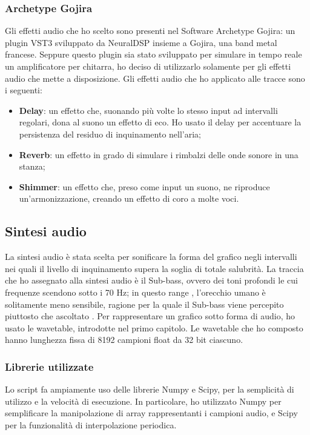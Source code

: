 \subsubsection{Archetype Gojira}
Gli effetti audio che ho scelto sono presenti nel Software Archetype Gojira: un plugin VST3 sviluppato da NeuralDSP insieme a Gojira, una band metal francese.
Seppure questo plugin sia stato sviluppato per simulare in tempo reale un amplificatore per chitarra, ho deciso di utilizzarlo solamente per gli effetti audio che mette a disposizione.
Gli effetti audio che ho applicato alle tracce sono i seguenti:
\begin{itemize}
    \item \textbf{Delay}: un effetto che, suonando più volte lo stesso input ad intervalli regolari, dona al suono un effetto di eco. Ho usato il delay per accentuare la persistenza del residuo di inquinamento nell'aria;
    \item \textbf{Reverb}: un effetto in grado di simulare i rimbalzi delle onde sonore in una stanza;
    \item \textbf{Shimmer}: un effetto che, preso come input un suono, ne riproduce un'armonizzazione, creando un effetto di coro a molte voci.
\end{itemize}

\subsection{Sintesi audio}
La sintesi audio è stata scelta per sonificare la forma del grafico negli intervalli nei quali il livello di inquinamento supera la soglia di totale salubrità.
La traccia che ho assegnato alla sintesi audio è il Sub-bass, ovvero dei toni profondi le cui frequenze scendono sotto i 70 Hz; in questo range , l'orecchio umano è solitamente meno sensibile, ragione per la quale il Sub-bass viene percepito piuttosto che ascoltato \cite{subbass}.
Per rappresentare un grafico sotto forma di audio, ho usato le wavetable, introdotte nel primo capitolo.
Le wavetable che ho composto hanno lunghezza fissa di 8192 campioni float da 32 bit ciascuno.
\subsubsection{Librerie utilizzate}
Lo script fa ampiamente uso delle librerie Numpy e Scipy, per la semplicità di utilizzo e la velocità di esecuzione.
In particolare, ho utilizzato Numpy per semplificare la manipolazione di array rappresentanti i campioni audio, e Scipy per la funzionalità di interpolazione periodica.
